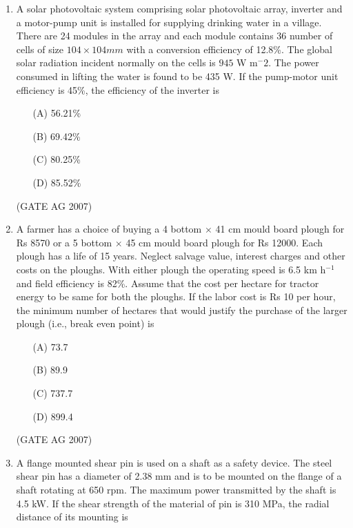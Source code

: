 \documentclass[journal,12pt,onecolumn]{IEEEtran}
\theoremstyle{remark}
\begin{document}
\begin{enumerate}[label=Q\arabic*:]
\item  A solar photovoltaic system comprising solar photovoltaic array, inverter and a motor-pump unit is installed for supplying drinking water in a village. There are 24 modules in the array and each module contains 36 number of cells of size $104 \times 104 mm$ with a conversion efficiency of 12.8\%. The global solar radiation incident normally on the cells is $945$ W m$^-2$. The power consumed in lifting the water is found to be 435 W. If the pump-motor unit efficiency is 45\%, the efficiency of the inverter is 
\begin{multicols}{4}
\begin{enumerate}
    \item [(A)] 56.21\%
    \item [(B)] 69.42\%
    \item [(C)] 80.25\%
    \item [(D)] 85.52\%
\end{enumerate}
\end{multicols}
\hfill(GATE AG 2007)

  \item A farmer has a choice of buying a 4 bottom $\times$ 41 cm mould board plough for Rs 8570 or a 5 bottom $\times$ 45 cm mould board plough for Rs 12000. Each plough has a life of 15 years. Neglect salvage value, interest charges and other costs on the ploughs. With either plough the operating speed is 6.5 km h$^{-1}$ and field efficiency is 82\%. Assume that the cost per hectare for tractor energy to be same for both the ploughs. If the labor cost is Rs 10 per hour, the minimum number of hectares that would justify the purchase of the larger plough (i.e., break even point) is  
\begin{multicols}{4}
\begin{enumerate}
    \item [(A)] 73.7
    \item [(B)] 89.9
    \item [(C)] 737.7
    \item [(D)] 899.4
\end{enumerate}
    
\end{multicols}
\hfill(GATE AG 2007)

\item  A flange mounted shear pin is used on a shaft as a safety device. The steel shear pin has a diameter of 2.38 mm and is to be mounted on the flange of a shaft rotating at 650 rpm. The maximum power transmitted by the shaft is 4.5 kW. If the shear strength of the material of pin is 310 MPa, the radial distance of its mounting is


\end{enumerate}
\end{document}
